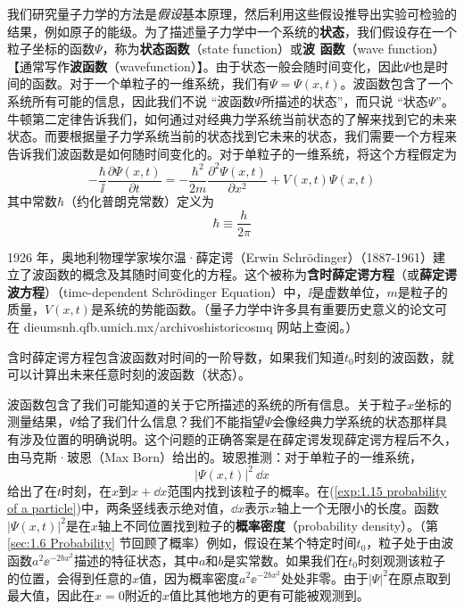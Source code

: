 	我们研究量子力学的方法是\textit{假设}基本原理，然后利用这些假设推导出实验可检验的结果，例如原子的能级。为了描述量子力学中一个系统的\textbf{状态}，我们假设存在一个粒子坐标的函数$\Psi$，称为\textbf{状态函数}（state function）或\textbf{波 函数}（wave function）【通常写作\textbf{波函数}（wavefunction）】。由于状态一般会随时间变化，因此$\Psi$也是时间的函数。对于一个单粒子的一维系统，我们有$\Psi=\Psi\left(x,t\right)$。波函数包含了一个系统所有可能的信息，因此我们不说 “波函数$\Psi$所描述的状态”，而只说 “状态$\Psi$”。 牛顿第二定律告诉我们，如何通过对经典力学系统当前状态的了解来找到它的未来状态。而要根据量子力学系统当前的状态找到它未来的状态，我们需要一个方程来告诉我们波函数是如何随时间变化的。对于单粒子的一维系统，将这个方程假定为
	\begin{equation}
		-\frac{\hbar}{\ii}\frac{\partial \Psi \left(x,t\right)}{\partial t}= -\frac{\hbar^2}{2m}\frac{\partial^2 \Psi \left(x,t\right)}{\partial x^2}+ V\left(x,t\right)\Psi\left(x,t\right)
		\label{eq:1.13 Time-dependent Schödinger equation}
	\end{equation}
	其中常数$\hbar$（约化普朗克常数）定义为
	\begin{equation}
		\boxed{\hbar \equiv \frac{h}{2 \pi}}
		\label{eq:1.14 h-bar's definition}
	\end{equation}

	1926 年，奥地利物理学家埃尔温·薛定谔（Erwin Schrödinger）（1887-1961）建立了波函数的概念及其随时间变化的方程。这个被称为\textbf{含时薛定谔方程}（或\textbf{薛定谔波方程}）（time-dependent Schrödinger Equation）中，$\ii$是虚数单位，$m$是粒子的质量，$V\left(x,t\right)$是系统的势能函数。（量子力学中许多具有重要历史意义的论文可在 dieumsnh.qfb.umich.mx/archivoshistoricosmq 网站上查阅。）

	含时薛定谔方程包含波函数对时间的一阶导数，如果我们知道$t_0$时刻的波函数，就可以计算出未来任意时刻的波函数（状态）。

	波函数包含了我们可能知道的关于它所描述的系统的所有信息。关于粒子$x$坐标的测量结果，$\Psi$给了我们什么信息？我们不能指望$\Psi$会像经典力学系统的状态那样具有涉及位置的明确说明。这个问题的正确答案是在薛定谔发现薛定谔方程后不久，由马克斯·玻恩（Max Born）给出的。玻恩推测：对于单粒子的一维系统，
	\begin{equation}
		\boxed{\left|\Psi \left(x,t\right)\right|^2 \:\dd x}
		\label{exp:1.15 probability of a particle}
	\end{equation}
	给出了在$t$时刻，在$x$到$x+ \dd x$范围内找到该粒子的概率。在(\ref{exp:1.15 probability of a particle})中，两条竖线表示绝对值，$\dd x$表示$x$轴上一个无限小的长度。函数$\left|\Psi \left(x,t\right)\right|^2$是在$x$轴上不同位置找到粒子的\textbf{概率密度}（probability density）。（第 \ref{sec:1.6 Probability} 节回顾了概率）例如，假设在某个特定时间$t_0$，粒子处于由波函数$a^2\ee^{-2bx^2}$描述的特征状态，其中$a$和$b$是实常数。如果我们在$t_0$时刻观测该粒子的位置，会得到任意的$x$值，因为概率密度$a^2\ee^{-2bx^2}$处处非零。由于$\left|\Psi\right|^2$在原点取到最大值，因此在$x=0$附近的$x$值比其他地方的更有可能被观测到。

